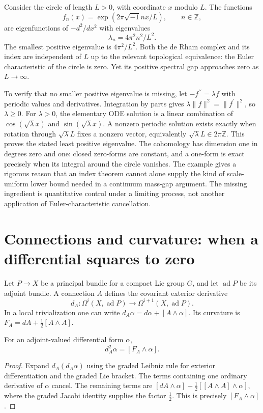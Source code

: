 Consider the circle of length $L>0$, with coordinate $x$ modulo $L$. The functions
\[
f_n(x)=\exp(2\pi\sqrt{-1}nx/L),\qquad n\in\mathbb Z,
\]
are eigenfunctions of $-d^2/dx^2$ with eigenvalues
\[
\lambda_n=4\pi^2n^2/L^2.
\]
The smallest positive eigenvalue is $4\pi^2/L^2$. Both the de Rham complex and its index are independent of $L$ up to the relevant topological equivalence: the Euler characteristic of the circle is zero. Yet its positive spectral gap approaches zero as $L\to\infty$.

To verify that no smaller positive eigenvalue is missing, let $-f^{\prime\prime}=\lambda f$ with periodic values and derivatives. Integration by parts gives $\lambda\|f\|^2=\|f^{\prime}\|^2$, so $\lambda\geq0$. For $\lambda>0$, the elementary ODE solution is a linear combination of $\cos(\sqrt\lambda x)$ and $\sin(\sqrt\lambda x)$. A nonzero periodic solution exists exactly when rotation through $\sqrt\lambda L$ fixes a nonzero vector, equivalently $\sqrt\lambda L\in2\pi\mathbb Z$. This proves the stated least positive eigenvalue. The cohomology has dimension one in degrees zero and one: closed zero-forms are constant, and a one-form is exact precisely when its integral around the circle vanishes. The example gives a rigorous reason that an index theorem cannot alone supply the kind of scale-uniform lower bound needed in a continuum mass-gap argument. The missing ingredient is quantitative control under a limiting process, not another application of Euler-characteristic cancellation.

\section{Connections and curvature: when a differential squares to zero}

Let $P\to X$ be a principal bundle for a compact Lie group $G$, and let $\operatorname{ad}P$ be its adjoint bundle. A connection $A$ defines the covariant exterior derivative
\[
d_A:\Omega^i(X,\operatorname{ad}P)\longrightarrow
       \Omega^{i+1}(X,\operatorname{ad}P).
\]
In a local trivialization one can write $d_A\alpha=d\alpha+[A\wedge\alpha]$. Its curvature is $F_A=dA+\tfrac12[A\wedge A]$.

\begin{proposition}
For an adjoint-valued differential form $\alpha$,
\[
d_A^2\alpha=[F_A\wedge\alpha].
\]
\end{proposition}
\begin{proof}
Expand $d_A(d_A\alpha)$ using the graded Leibniz rule for exterior differentiation and the graded Lie bracket. The terms containing one ordinary derivative of $\alpha$ cancel. The remaining terms are $[dA\wedge\alpha]+\tfrac12[[A\wedge A]\wedge\alpha]$, where the graded Jacobi identity supplies the factor $\tfrac12$. This is precisely $[F_A\wedge\alpha]$.
\end{proof}

